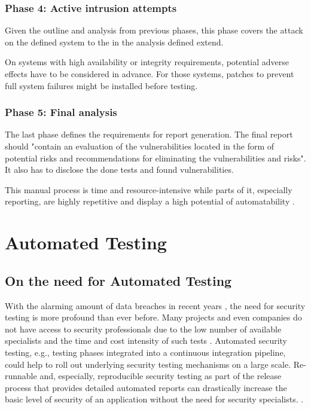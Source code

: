 \subsubsection{Phase 4: Active intrusion attempts}
Given the outline and analysis from previous phases, this phase covers the attack on the defined system to the in the analysis defined extend.

On systems with high availability or integrity requirements, potential adverse effects have to be considered in advance. For those systems, patches to prevent full system failures might be installed before testing. 

\subsubsection{Phase 5: Final analysis}
The last phase defines the requirements for report generation. The final report should "contain an evaluation of the vulnerabilities located in the form of potential risks and recommendations for eliminating the vulnerabilities and risks". It also has to disclose the done tests and found vulnerabilities. \citep{bsiStudy2020}


This manual process is time and resource-intensive while parts of it, especially reporting, are highly repetitive and display a high potential of automatability \citep{passi2018}.


\newpage

\section{Automated Testing}
\subsection{On the need for Automated Testing}
With the alarming amount of data breaches in recent years \citep{dataBreaches2019}, the need for security testing is more profound than ever before.
Many projects and even companies do not have access to security professionals due to the low number of available specialists and the time and cost intensity of such tests \citep{autoPentestOverview2018}.
Automated security testing, e.g., testing phases integrated into a continuous integration pipeline, could help to roll out underlying security testing mechanisms on a large scale.
Re-runnable and, especially, reproducible security testing as part of the release process that provides detailed automated reports can drastically increase the basic level of security of an application without the need for security specialists. \citep{vijayan2019}.

